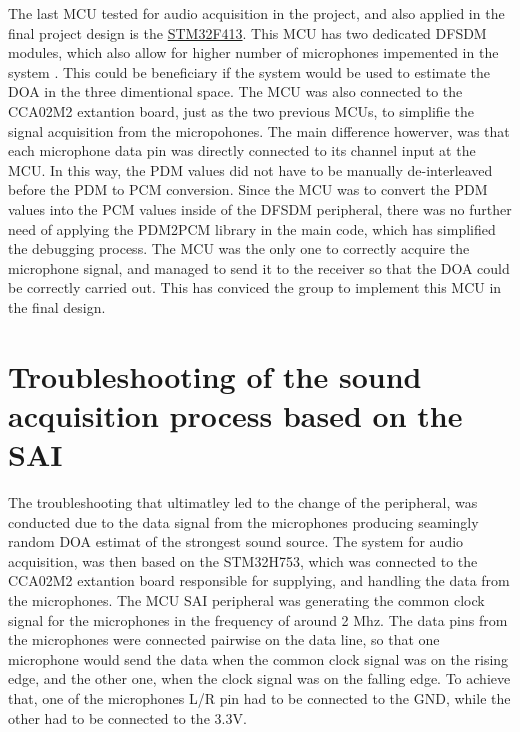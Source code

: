 The last MCU tested for audio acquisition in the project, and also applied in the final project design is the \href{https://www.st.com/en/microcontrollers-microprocessors/stm32f413-423.html}{STM32F413}. This MCU has two dedicated DFSDM modules, which also allow for higher number of microphones impemented in the system . This could be beneficiary if the system would be used to estimate the DOA in the three dimentional space. 
The MCU was also connected to the CCA02M2 extantion board, just as the two previous MCUs, to simplifie the signal acquisition from the micropohones. The main difference howerver, was that each microphone data pin was directly connected to its channel input at the MCU. In this way, the PDM values did not have to be manually de-interleaved before the PDM to PCM conversion. Since the MCU was to convert the PDM values into the PCM values inside of the DFSDM peripheral, there was no further need of applying the PDM2PCM library in the main code, which has simplified the debugging process. The MCU was the only one to correctly acquire the microphone signal, and managed to send it to the receiver so that the DOA could be correctly carried out. This has conviced the group to implement this MCU in the final design. 


\section{Troubleshooting of the sound acquisition process based on the SAI}
\label{sec:troubleshooting_sound_acquisition}

The troubleshooting that ultimatley led to the change of the peripheral, was conducted due to the data signal from the microphones producing seamingly random DOA estimat of the strongest sound source. The system for audio acquisition, was then based on the STM32H753, which was connected to the CCA02M2 extantion board responsible for supplying, and handling the data from the microphones. The MCU SAI peripheral was generating the common clock signal for the microphones in the frequency of around 2 Mhz. The data pins from the microphones were connected pairwise on the data line, so that one microphone would send the data when the common clock signal was on the rising edge, and the other one, when the clock signal was on the falling edge. To achieve that, one of the microphones L/R pin had to be connected to the GND, while the other had to be connected to the 3.3V. \\

